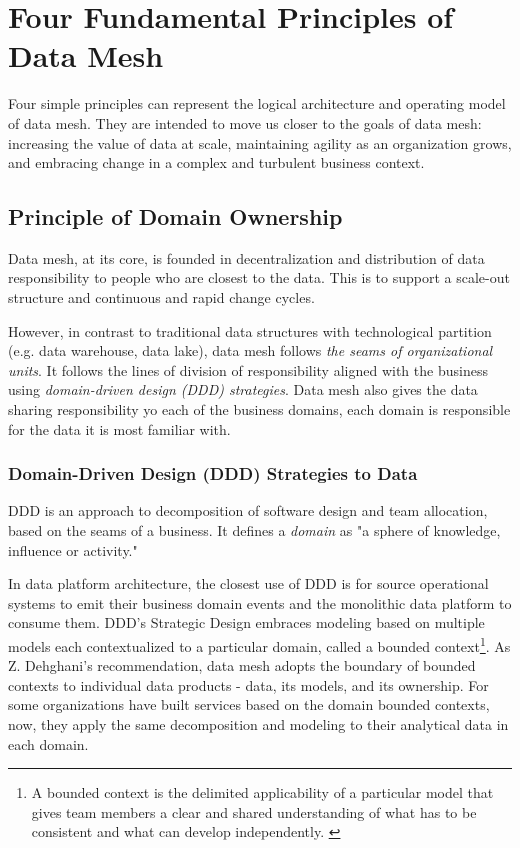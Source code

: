 \documentclass[12pt, a4paper]{book}
\begin{document}
\section{Four Fundamental Principles of Data Mesh}\label{4principles}
Four simple principles can represent the logical architecture and operating model of data mesh. They are intended to move us closer to the goals of data mesh: increasing the value of data at scale, maintaining agility as an organization grows, and embracing change in a complex and turbulent business context.

\subsection{Principle of Domain Ownership}
Data mesh, at its core, is founded in decentralization and distribution of data responsibility to people who are closest to the data. This is to support a scale-out structure and continuous and rapid change cycles.

However, in contrast to traditional data structures with technological partition (e.g. data warehouse, data lake), data mesh follows \textit{the seams of organizational units}. It follows the lines of division of responsibility aligned with the business using \textit{domain-driven design (DDD) strategies}. Data mesh also gives the data sharing responsibility yo each of the business domains, each domain is responsible for the data it is most familiar with.

\subsubsection*{Domain-Driven Design (DDD) Strategies to Data}
DDD is an approach to decomposition of software design and team allocation, based on the seams of a business. It defines a \textit{domain} as "a sphere of knowledge, influence or activity."

In data platform architecture, the closest use of DDD is for source operational systems to emit their business domain events and the monolithic data platform to consume them. DDD’s Strategic Design embraces modeling based on multiple models each contextualized to a particular domain, called a bounded context\footnote{A bounded context is the delimited applicability of a particular model that gives team members a clear and shared understanding of what has to be consistent and what can develop independently. \cite{dddevan}}. As Z. Dehghani's recommendation, data mesh adopts the boundary of bounded contexts to individual data products - data, its models, and its ownership. For some organizations have built services based on the domain bounded contexts, now, they apply the same decomposition and modeling to their analytical data in each domain.
\end{document}
